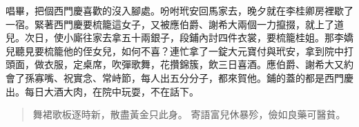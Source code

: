 唱畢，把個西門慶喜歡的沒入腳處。吩咐玳安回馬家去，晚夕就在李桂卿房裡歇了一宿。緊著西門慶要梳籠這女子，又被應伯爵、謝希大兩個一力攛掇，就上了道兒。次日，使小廝往家去拿五十兩銀子，段鋪內討四件衣裳，要梳籠桂姐。那李嬌兒聽見要梳籠他的侄女兒，如何不喜？連忙拿了一錠大元寶付與玳安，拿到院中打頭面，做衣服，定桌席，吹彈歌舞，花攢錦簇，飲三日喜酒。應伯爵、謝希大又約會了孫寡嘴、祝實念、常峙節，每人出五分分子，都來賀他。鋪的蓋的都是西門慶出。每日大酒大肉，在院中玩耍，不在話下。

\begin{quote}
舞裙歌板逐時新，散盡黃金只此身。
寄語富兒休暴殄，儉如良藥可醫貧。
\end{quote}
